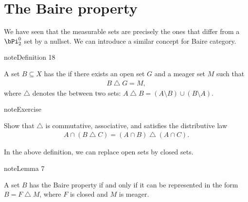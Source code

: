 \documentclass[letterpaper,10pt,english]{jupyterBook}
\begin{document}
\section{The Baire property}
\label{\detokenize{measure:the-baire-property}}
\sphinxAtStartPar
We have seen that the measurable sets are precisely the ones that differ from a \(\bPi^0_2\) set by a nullset.
We can introduce a similar concept for Baire category.
\label{measure:def-BP}
\begin{sphinxadmonition}{note}{Definition 18}



\sphinxAtStartPar
A set \(B \subseteq X\) has the  if there exists an open set \(G\) and a meager set \(M\) such that
\begin{equation*}
\begin{split}
    B \bigtriangleup G = M,
\end{split}
\end{equation*}
\sphinxAtStartPar
where \(\bigtriangleup\) denotes the  between two sets: \(A \bigtriangleup B = (A\setminus B) \cup (B \setminus A)\).
\end{sphinxadmonition}

\begin{sphinxadmonition}{note}{Exercise}

\sphinxAtStartPar
Show that \(\bigtriangleup\) is commutative, associative, and satisfies the distributive law
\begin{equation*}
\begin{split}
A \cap (B \bigtriangleup C) = (A \cap B) \bigtriangleup (A \cap C).
\end{split}
\end{equation*}\end{sphinxadmonition}

\sphinxAtStartPar
In the above definition, we can replace open sets by closed sets.
\label{measure:lem-BP-closed}
\begin{sphinxadmonition}{note}{Lemma 7}



\sphinxAtStartPar
A set \(B\) has the Baire property if and only if it can be represented in the form \(B = F \bigtriangleup M\),  where \(F\) is closed and \(M\) is meager.
\end{sphinxadmonition}
\end{document}
